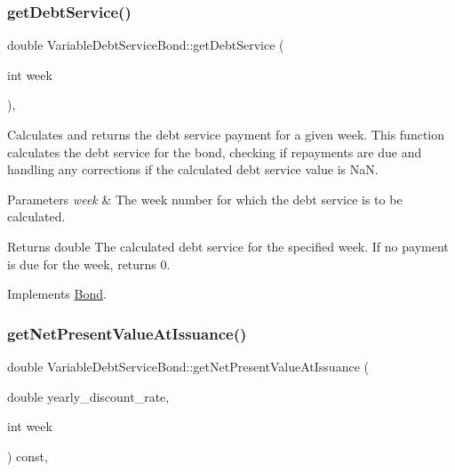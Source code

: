 \subsubsection{\texorpdfstring{get\+Debt\+Service()}{getDebtService()}}
{\footnotesize\ttfamily double Variable\+Debt\+Service\+Bond\+::get\+Debt\+Service (\begin{DoxyParamCaption}\item[{int}]{week }\end{DoxyParamCaption})\hspace{0.3cm}{\ttfamily [override]}, {\ttfamily [virtual]}}



Calculates and returns the debt service payment for a given week. This function calculates the debt service for the bond, checking if repayments are due and handling any corrections if the calculated debt service value is NaN. 


\begin{DoxyParams}{Parameters}
{\em week} & The week number for which the debt service is to be calculated.\\
\hline
\end{DoxyParams}
\begin{DoxyReturn}{Returns}
double The calculated debt service for the specified week. If no payment is due for the week, returns 0. 
\end{DoxyReturn}


Implements \mbox{\hyperlink{classBond_a98d8ecaf4b36319674ebd220598996bc}{Bond}}.

\mbox{\label{classVariableDebtServiceBond_a8cc7ee442d788b91b8c00e6bed07644d}} 
\subsubsection{\texorpdfstring{get\+Net\+Present\+Value\+At\+Issuance()}{getNetPresentValueAtIssuance()}}
{\footnotesize\ttfamily double Variable\+Debt\+Service\+Bond\+::get\+Net\+Present\+Value\+At\+Issuance (\begin{DoxyParamCaption}\item[{double}]{yearly\+\_\+discount\+\_\+rate,  }\item[{int}]{week }\end{DoxyParamCaption}) const\hspace{0.3cm}{\ttfamily [override]}, {\ttfamily [virtual]}}



